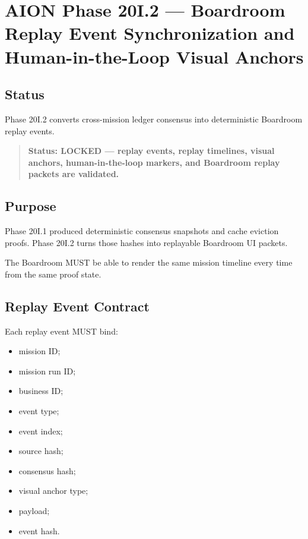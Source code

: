 \section{AION Phase 20I.2 --- Boardroom Replay Event Synchronization and Human-in-the-Loop Visual Anchors}
\label{sec:aion-phase20i2-boardroom-replay-sync}

\subsection{Status}

Phase 20I.2 converts cross-mission ledger consensus into deterministic Boardroom replay events.

\begin{quote}
\textbf{Status: LOCKED --- replay events, replay timelines, visual anchors, human-in-the-loop markers, and Boardroom replay packets are validated.}
\end{quote}

\subsection{Purpose}

Phase 20I.1 produced deterministic consensus snapshots and cache eviction proofs. Phase 20I.2 turns those hashes into replayable Boardroom UI packets.

The Boardroom MUST be able to render the same mission timeline every time from the same proof state.

\subsection{Replay Event Contract}

Each replay event MUST bind:

\begin{itemize}
  \item mission ID;
  \item mission run ID;
  \item business ID;
  \item event type;
  \item event index;
  \item source hash;
  \item consensus hash;
  \item visual anchor type;
  \item payload;
  \item event hash.
\end{itemize}

